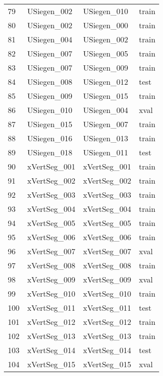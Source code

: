 \begin{tabular}{llll}
79  &       USiegen\_002 &       USiegen\_010 &  train \\
80  &       USiegen\_002 &       USiegen\_000 &  train \\
81  &       USiegen\_004 &       USiegen\_002 &  train \\
82  &       USiegen\_007 &       USiegen\_005 &  train \\
83  &       USiegen\_007 &       USiegen\_009 &  train \\
84  &       USiegen\_008 &       USiegen\_012 &   test \\
85  &       USiegen\_009 &       USiegen\_015 &  train \\
86  &       USiegen\_010 &       USiegen\_004 &   xval \\
87  &       USiegen\_015 &       USiegen\_007 &  train \\
88  &       USiegen\_016 &       USiegen\_013 &  train \\
89  &       USiegen\_018 &       USiegen\_011 &   test \\
90  &      xVertSeg\_001 &      xVertSeg\_001 &  train \\
91  &      xVertSeg\_002 &      xVertSeg\_002 &  train \\
92  &      xVertSeg\_003 &      xVertSeg\_003 &  train \\
93  &      xVertSeg\_004 &      xVertSeg\_004 &  train \\
94  &      xVertSeg\_005 &      xVertSeg\_005 &  train \\
95  &      xVertSeg\_006 &      xVertSeg\_006 &  train \\
96  &      xVertSeg\_007 &      xVertSeg\_007 &   xval \\
97  &      xVertSeg\_008 &      xVertSeg\_008 &  train \\
98  &      xVertSeg\_009 &      xVertSeg\_009 &   xval \\
99  &      xVertSeg\_010 &      xVertSeg\_010 &  train \\
100 &      xVertSeg\_011 &      xVertSeg\_011 &   test \\
101 &      xVertSeg\_012 &      xVertSeg\_012 &  train \\
102 &      xVertSeg\_013 &      xVertSeg\_013 &  train \\
103 &      xVertSeg\_014 &      xVertSeg\_014 &   test \\
104 &      xVertSeg\_015 &      xVertSeg\_015 &   xval \\
\bottomrule
\end{tabular}
